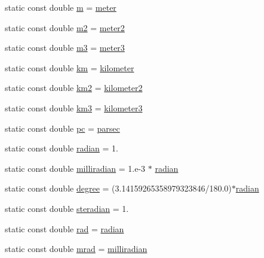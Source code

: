 \begin{DoxyCompactItemize}
\item 
static const double \hyperlink{namespacedd4hep_a443d1517e365c8f0c3a498bff0f09088}{m} = \hyperlink{namespacedd4hep_a46f5cf0231796af4296a307a58812b06}{meter}
\item 
static const double \hyperlink{namespacedd4hep_aea4ab60384218f15ec3ba53896735b6c}{m2} = \hyperlink{namespacedd4hep_afe718b0d811af6b4d45c556e3a0e87a3}{meter2}
\item 
static const double \hyperlink{namespacedd4hep_a9e16f264f9812fefbe417d510185205b}{m3} = \hyperlink{namespacedd4hep_a4f771b88b1ff2018c0dacd3a1b56023b}{meter3}
\item 
static const double \hyperlink{namespacedd4hep_ab6ce99bfb21ce99b93b69efc2f5ad7a4}{km} = \hyperlink{namespacedd4hep_a689bd0289c6c83e392d385bc870a34ab}{kilometer}
\item 
static const double \hyperlink{namespacedd4hep_a94b468639aec795c528305ad9ba0245e}{km2} = \hyperlink{namespacedd4hep_a61bb5393f7b8ec3694cb8e522145695f}{kilometer2}
\item 
static const double \hyperlink{namespacedd4hep_a4f0627a7e7338d69e3d58675ddbd95f6}{km3} = \hyperlink{namespacedd4hep_a4501dea229a9ace2c46c427c69ddb5aa}{kilometer3}
\item 
static const double \hyperlink{namespacedd4hep_a463cd79bb27007361a510abb0d10665d}{pc} = \hyperlink{namespacedd4hep_a6d097c8b8fee88c7f77ebdfe2923ac45}{parsec}
\item 
static const double \hyperlink{namespacedd4hep_aa67a6662923dd0138a6bf6713eddcebb}{radian} = 1.
\item 
static const double \hyperlink{namespacedd4hep_a7502a4a65dcbf4395be335d0ba214a82}{milliradian} = 1.e-\/3 $\ast$ \hyperlink{namespacedd4hep_aa67a6662923dd0138a6bf6713eddcebb}{radian}
\item 
static const double \hyperlink{namespacedd4hep_a9fbc5184e0fbd4235e8efb28cc3ab3af}{degree} = (3.14159265358979323846/180.0)$\ast$\hyperlink{namespacedd4hep_aa67a6662923dd0138a6bf6713eddcebb}{radian}
\item 
static const double \hyperlink{namespacedd4hep_a0a902cdeced2ad28da2d32515e540867}{steradian} = 1.
\item 
static const double \hyperlink{namespacedd4hep_a9ceaf1c73ffb1a7f13abb23683ac32ba}{rad} = \hyperlink{namespacedd4hep_aa67a6662923dd0138a6bf6713eddcebb}{radian}
\item 
static const double \hyperlink{namespacedd4hep_acc4b11e3d4313ca95a536c6467087bb1}{mrad} = \hyperlink{namespacedd4hep_a7502a4a65dcbf4395be335d0ba214a82}{milliradian}

\end{DoxyCompactItemize}
